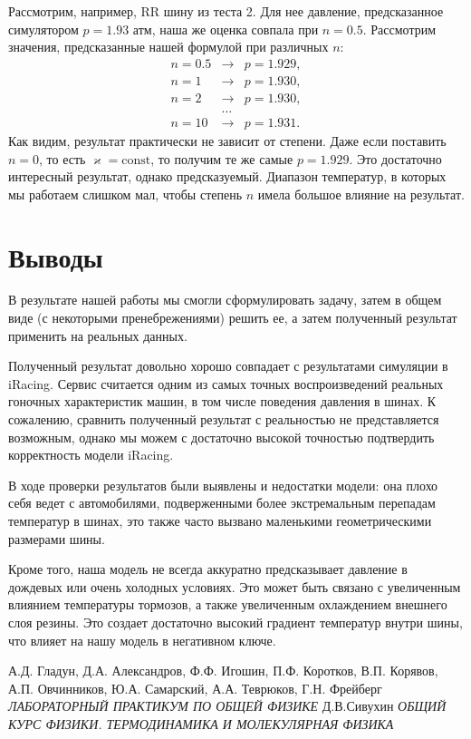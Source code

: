 \documentclass[a4paper,12pt]{report}
\begin{document}
        Рассмотрим, например, RR шину из теста 2. Для нее давление, предсказанное симулятором $p=1.93$ атм, наша же оценка совпала при $n=0.5$. Рассмотрим значения, предсказанные нашей формулой при различных $n$:
        \begin{eqnarray*}
            n=0.5 & \rightarrow & p=1.929,\\
            n=1 & \rightarrow & p=1.930,\\
            n=2 & \rightarrow & p=1.930,\\
            &\dots&\\
            n=10 & \rightarrow & p=1.931.
        \end{eqnarray*}
        Как видим, результат практически не зависит от степени. Даже если поставить $n=0$, то есть $\varkappa=\text{const}$, то получим те же самые $p=1.929$. Это достаточно интересный результат, однако предсказуемый. Диапазон температур, в которых мы работаем слишком мал, чтобы степень $n$ имела большое влияние на результат.
    \section{Выводы}
        В результате нашей работы мы смогли сформулировать задачу, затем в общем виде (с некоторыми пренебрежениями) решить ее, а затем полученный результат применить на реальных данных.

        Полученный результат довольно хорошо совпадает с результатами симуляции в iRacing. Сервис считается одним из самых точных воспроизведений реальных гоночных характеристик машин, в том числе поведения давления в шинах. К сожалению, сравнить полученный результат с реальностью не представляется возможным, однако мы можем с достаточно высокой точностью подтвердить корректность модели iRacing.

        В ходе проверки результатов были выявлены и недостатки модели: она плохо себя ведет с автомобилями, подверженными более экстремальным перепадам температур в шинах, это также часто вызвано маленькими геометрическими размерами шины.

        Кроме того, наша модель не всегда аккуратно предсказывает давление в дождевых или очень холодных условиях. Это может быть связано с увеличенным влиянием температуры тормозов, а также увеличенным охлаждением внешнего слоя резины. Это создает достаточно высокий градиент температур внутри шины, что влияет на нашу модель в негативном ключе.

    \begin{thebibliography}{9}
        А.Д. Гладун, Д.А. Александров, Ф.Ф. Игошин, П.Ф. Коротков,
В.П. Корявов, А.П. Овчинников, Ю.А. Самарский, А.А. Теврюков,
Г.Н. Фрейберг \emph{ЛАБОРАТОРНЫЙ
ПРАКТИКУМ
ПО ОБЩЕЙ ФИЗИКЕ}
        Д.В.Сивухин
\emph{ОБЩИЙ КУРС ФИЗИКИ.
ТЕРМОДИНАМИКА И МОЛЕКУЛЯРНАЯ ФИЗИКА}
    \end{thebibliography}
\end{document}
